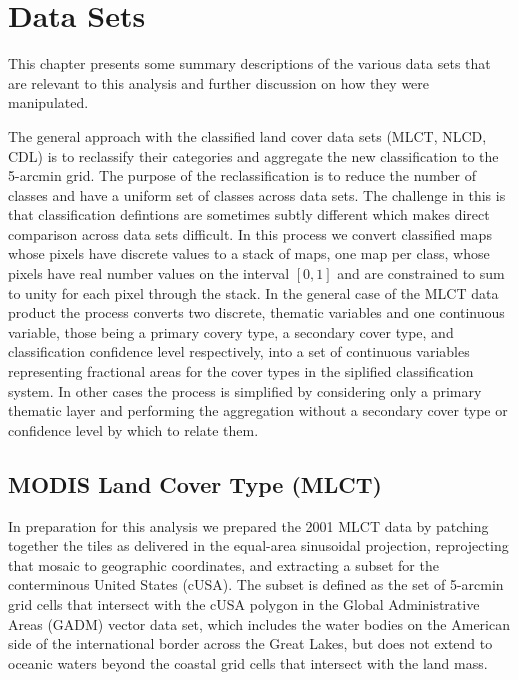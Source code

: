 







\graphicspath{ {datasets/} }


\chapter{Data Sets}
\label{cha:datasets}

This chapter presents some summary descriptions of the various data
sets that are relevant to this analysis and further discussion on how
they were manipulated.

The general approach with the classified land cover data sets (MLCT,
NLCD, CDL) is to reclassify their categories and aggregate the new
classification to the 5-arcmin grid.  The purpose of the
reclassification is to reduce the number of classes and have a uniform
set of classes across data sets.  The challenge in this is that
classification defintions are sometimes subtly different which makes
direct comparison across data sets difficult.  In this process we
convert classified maps whose pixels have discrete values to a stack
of maps, one map per class, whose pixels have real number values on
the interval $[0,1]$ and are constrained to sum to unity for each
pixel through the stack.  In the general case of the MLCT data product
the process converts two discrete, thematic variables and one
continuous variable, those being a primary covery type, a secondary
cover type, and classification confidence level respectively, into a
set of continuous variables representing fractional areas for the
cover types in the siplified classification system.  In other cases
the process is simplified by considering only a primary thematic layer
and performing the aggregation without a secondary cover type or
confidence level by which to relate them.


\section{MODIS Land Cover Type (MLCT)}
\label{sec:mlct}

In preparation for this analysis we prepared the 2001 MLCT data by patching
together the tiles as delivered in the equal-area sinusoidal
projection, reprojecting that mosaic to geographic coordinates, and
extracting a subset for the conterminous United States (cUSA).  The
subset is defined as the set of 5-arcmin grid cells that intersect
with the cUSA polygon in the Global Administrative Areas (GADM) vector
data set, which includes the water bodies on the American side of the
international border across the Great Lakes, but does not extend to
oceanic waters beyond the coastal grid cells that intersect with the
land mass.  

